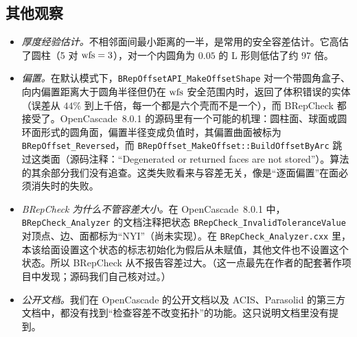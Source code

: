 \subsection{其他观察}
\begin{itemize}
\item \emph{厚度经验估计。}不相邻面间最小距离的一半，是常用的安全容差估计。它高估了圆柱（5 对 $\operatorname{wfs}=3$），对一个内圆角为 $0.05$ 的 L 形则低估了约 $97$ 倍。
\item \emph{偏置。}在默认模式下，\texttt{BRepOffsetAPI\_MakeOffsetShape} 对一个带圆角盒子、向内偏置距离大于圆角半径但仍在 $\operatorname{wfs}$ 安全范围内时，返回了体积错误的实体（误差从 $44\%$ 到上千倍，每一个都是六个壳而不是一个），而 BRepCheck 都接受了。OpenCascade~8.0.1 的源码里有一个可能的机理：圆柱面、球面或圆环面形式的圆角面，偏置半径变成负值时，其偏置曲面被标为 \texttt{BRepOffset\_Reversed}，而 \texttt{BRepOffset\_MakeOffset::BuildOffsetByArc} 跳过这类面（源码注释：``Degenerated or returned faces are not stored''）。算法的其余部分我们没有追查。这类失败看来与容差无关，像是``逐面偏置''在面必须消失时的失败。
\item \emph{BRepCheck 为什么不管容差大小。}在 OpenCascade~8.0.1 中，\texttt{BRepCheck\_Analyzer} 的文档注释把状态 \texttt{BRepCheck\_InvalidToleranceValue} 对顶点、边、面都标为``NYI''（尚未实现）。在 \texttt{BRepCheck\_Analyzer.cxx} 里，本该给面设置这个状态的标志初始化为假后从未赋值，其他文件也不设置这个状态。所以 BRepCheck 从不报告容差过大。（这一点最先在作者的配套著作项目中发现；源码我们自己核对过。）
\item \emph{公开文档。}我们在 OpenCascade 的公开文档以及 ACIS、Parasolid 的第三方文档中，都没有找到``检查容差不改变拓扑''的功能。这只说明文档里没有提到。
\end{itemize}
